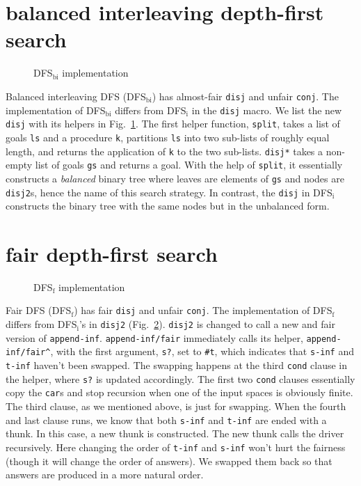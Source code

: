 \documentclass[format=acmlarge, review=true, authordraft=true]{acmart}
\newcommand{\conj}{\texttt{conj}}
\newcommand{\disj}{\texttt{disj}}
\begin{document}
\section{balanced interleaving depth-first search}

\begin{figure}
	
	\caption{DFS$_\textrm{bi}$ implementation}
	\label{balanced-disj}
\end{figure}

Balanced interleaving DFS (DFS$_\textrm{bi}$) has almost-fair \disj{} and unfair \conj{}. 
The implementation of DFS$_\textrm{bi}$ differs from DFS$_\textrm{i}$ in the \disj{} macro. We list the 
new \disj{} with its helpers in Fig.~\ref{balanced-disj}. The first helper 
function, \texttt{split}, takes a list of goals \texttt{ls} and a procedure 
\texttt{k}, partitions \texttt{ls} into two sub-lists of roughly equal length, 
and returns the application of \texttt{k} to the two sub-lists. \texttt{disj*} 
takes a non-empty list of goals \texttt{gs} and returns a goal. With the help 
of \texttt{split}, it essentially constructs a \emph{balanced} binary tree 
where leaves are elements of \texttt{gs} and nodes are \texttt{disj2}s, hence 
the name of this search strategy. In contrast, the \disj{} in DFS$_\textrm{i}$
constructs the binary tree with the same nodes but in the unbalanced form.

\section{fair depth-first search}

\begin{figure}
	
	\caption{DFS$_\textrm{f}$ implementation}
	\label{fDFS}
\end{figure}

Fair DFS (DFS$_\textrm{f}$) has fair \disj{} and unfair \conj{}. The implementation of DFS$_\textrm{f}$ 
differs from DFS$_\textrm{i}$'s in \texttt{disj2} (Fig.~\ref{fDFS}). \texttt{disj2} is 
changed to call a new and fair version of \texttt{append-inf}. 
\texttt{append-inf/fair} immediately calls its helper, 
\texttt{append-inf/fair\^{}}, with the first argument, \texttt{s?}, set to 
\texttt{\#{}t}, which indicates that \texttt{s-inf} and \texttt{t-inf} haven't 
been swapped. The swapping happens at the third \texttt{cond} clause in the 
helper, where \texttt{s?} is updated accordingly. The first two \texttt{cond} 
clauses essentially copy the \texttt{car}s and stop recursion when one of the 
input spaces is obviously finite. The third clause, as we mentioned above, is 
just for swapping. When the fourth and last clause runs, we know that both 
\texttt{s-inf} and \texttt{t-inf} are ended with a thunk. In this case, a new 
thunk is constructed. The new thunk calls the driver recursively. Here changing 
the order of \texttt{t-inf} and \texttt{s-inf} won't hurt the fairness (though 
it will change the order of answers). We swapped them back so that answers are 
produced in a more natural order.
\end{document}
